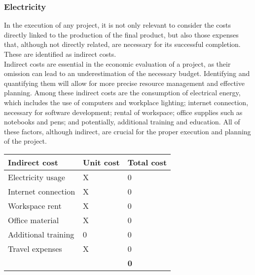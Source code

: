 \documentclass[../memory.tex]{subfiles}
\begin{document}
\subsubsection{Electricity}
In the execution of any project, it is not only relevant to consider the costs
directly linked to the production of the final product, but also those expenses
that, although not directly related, are necessary for its successful
completion. These are identified as indirect costs.
\\[8pt]
Indirect costs are essential in the economic evaluation of a project, as their
omission can lead to an underestimation of the necessary budget. Identifying and
quantifying them will allow for more precise resource management and effective
planning. Among these indirect costs are the consumption of electrical energy,
which includes the use of computers and workplace lighting; internet connection,
necessary for software development; rental of workspace; office supplies such as
notebooks and pens; and potentially, additional training and education. All of
these factors, although indirect, are crucial for the proper execution and
planning of the project.
\\[12pt]
\begin{tabularx}{\textwidth}{|X|X|X|}
	\hline
	\rowcolor{rowColor}
	Indirect cost         & Unit cost           & Total cost \\
	\hline
	Electricity usage     & X                   & 0\texteuro \\
	\hline
	Internet connection   & X                   & 0\texteuro \\
	\hline
	Workspace rent        & X                   & 0\texteuro \\
	\hline
	Office material       & X                   & 0\texteuro \\
	\hline
	Additional training   & 0\texteuro          & 0\texteuro \\
	\hline
	Travel expenses       & X                   & 0\texteuro \\
	\hline
	\multicolumn{2}{X|}{} & \textbf{0\texteuro}              \\
	\cline{3-3}
\end{tabularx}
\end{document}
